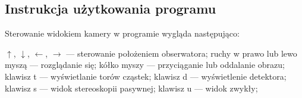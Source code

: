 \begin{appendices}
\newpage
\section{Instrukcja użytkowania programu}
\label{instrukcja}
Sterowanie widokiem kamery w programie wygląda następująco:
\begin{itemize}
\itemi $\uparrow$, $\downarrow$, $\leftarrow$, $\rightarrow$ --- sterowanie położeniem obserwatora;
\itemi ruchy w prawo lub lewo myszą --- rozglądanie się;
\itemi kółko myszy --- przyciąganie lub oddalanie obrazu;
\itemi klawisz t --- wyświetlanie torów cząstek;
\itemi klawisz d --- wyświetlenie detektora;
\itemi klawisz s --- widok stereoskopii pasywnej;
\itemi klawisz u --- widok zwykły;
\end{itemize}
\end{appendices}

\newpage
\newpage
\listoffigures
\newpage
\listoftables


